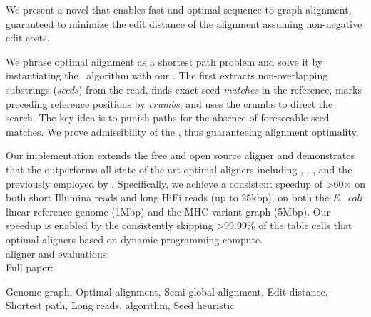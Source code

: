 %
We present a novel \A \textit{\seedh} that enables fast and optimal
sequence-to-graph alignment, guaranteed to minimize the edit distance of the
alignment assuming non-negative edit costs.

We phrase optimal alignment as a shortest path problem and solve it by
instantiating the \A~algorithm with our \seedh. The \seedh first extracts
non-overlapping substrings (\textit{seeds}) from the read, finds exact seed
\textit{matches} in the reference, marks preceding reference positions by
\textit{crumbs}, and uses the crumbs to direct the \A search. The key idea is to
punish paths for the absence of foreseeable seed matches. We prove admissibility
of the \seedh, thus guaranteeing alignment optimality.

\qquad Our implementation extends the free and open source aligner and
demonstrates that the \seedh outperforms all state-of-the-art optimal aligners
including \graphaligner, \vargas, \pasgal, and the \prefixh previously employed
by \astarix. Specifically, we achieve a consistent speedup of >60$\times$ on
both short Illumina reads and long HiFi reads (up to 25kbp), on both the
\textit{E.~coli} linear reference genome (1Mbp) and the MHC variant graph
(5Mbp). Our speedup is enabled by the \seedh consistently skipping >99.99\% of
the table cells that optimal aligners based on dynamic programming
compute.\\

\astarix aligner and evaluations: \astarixurl\\
Full paper: \astarixbiorxivurl

Genome graph, Optimal alignment, Semi-global alignment, Edit distance, Shortest
path, Long reads, \A algorithm, Seed heuristic
